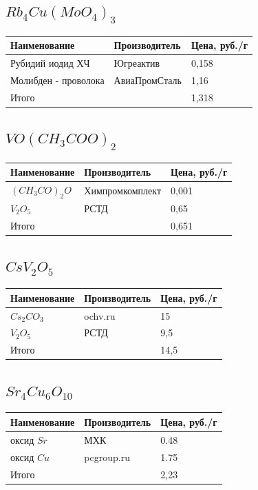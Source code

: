 \documentclass[11pt]{article}
\begin{document}
\subsection{$Rb_4Cu(MoO_4)_3$}
\begin{tabular}{|l|l|l|}
\hline
	Наименование  & Производитель & Цена, руб./г\\
\hline
	Рубидий иодид ХЧ & Югреактив & 0,158  \\
\hline
	Молибден - проволока & АвиаПромСталь & 1,16\\
\hline	
	Итого & & 1,318 \\
\hline
\end{tabular}


\subsection{$VO(CH_3COO)_2$}
\begin{tabular}{|l|l|l|}
\hline
	Наименование  & Производитель & Цена, руб./г\\
\hline
	$(CH_3CO)_2O$ & Химпромкомплект & 0,001  \\
\hline
	$V_2O_5$ & РСТД & 0,65\\
\hline	
	Итого & & 0,651 \\
\hline
\end{tabular}



\subsection{$CsV_2O_5$}
\begin{tabular}{|l|l|l|}
\hline
	Наименование  & Производитель & Цена, руб./г\\
\hline
	$Cs_2CO_3$ & ochv.ru &  15 \\
\hline
	$V_2O_5$ & РСТД & 9,5\\
\hline	
	Итого & & 14,5 \\
\hline
\end{tabular}

\subsection{$Sr_4Cu_6O_{10}$}
\begin{tabular}{|l|l|l|}
\hline
	Наименование  & Производитель & Цена, руб./г\\
\hline	
	оксид $Sr$ & МХК & 0.48\\
\hline	
	оксид $Cu$ & pcgroup.ru & 1.75\\
\hline	
	Итого & & 2,23 \\

\hline
\end{tabular}
\end{document}
